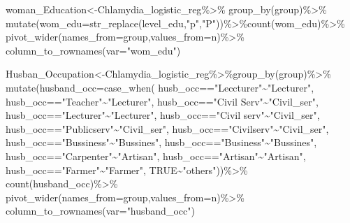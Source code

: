 \documentclass[
]{article}
\newenvironment{Shaded}{\begin{snugshade}}{\end{snugshade}}
\newcommand{\AttributeTok}[1]{\textcolor[rgb]{0.77,0.63,0.00}{#1}}
\newcommand{\ConstantTok}[1]{\textcolor[rgb]{0.00,0.00,0.00}{#1}}
\newcommand{\FunctionTok}[1]{\textcolor[rgb]{0.00,0.00,0.00}{#1}}
\newcommand{\NormalTok}[1]{#1}
\newcommand{\OtherTok}[1]{\textcolor[rgb]{0.56,0.35,0.01}{#1}}
\newcommand{\SpecialCharTok}[1]{\textcolor[rgb]{0.00,0.00,0.00}{#1}}
\newcommand{\StringTok}[1]{\textcolor[rgb]{0.31,0.60,0.02}{#1}}
\begin{document}
\begin{Shaded}
\begin{Highlighting}[]
\NormalTok{woman\_Education}\OtherTok{\textless{}{-}}\NormalTok{Chlamydia\_logistic\_reg}\SpecialCharTok{\%\textgreater{}\%}
  \FunctionTok{group\_by}\NormalTok{(group)}\SpecialCharTok{\%\textgreater{}\%}
  \FunctionTok{mutate}\NormalTok{(}\AttributeTok{wom\_edu=}\FunctionTok{str\_replace}\NormalTok{(level\_edu,}\StringTok{"p"}\NormalTok{,}\StringTok{"P"}\NormalTok{))}\SpecialCharTok{\%\textgreater{}\%}\FunctionTok{count}\NormalTok{(wom\_edu)}\SpecialCharTok{\%\textgreater{}\%}
  \FunctionTok{pivot\_wider}\NormalTok{(}\AttributeTok{names\_from=}\NormalTok{group,}\AttributeTok{values\_from=}\NormalTok{n)}\SpecialCharTok{\%\textgreater{}\%}
  \FunctionTok{column\_to\_rownames}\NormalTok{(}\AttributeTok{var=}\StringTok{"wom\_edu"}\NormalTok{)}

\NormalTok{Husban\_Occupation}\OtherTok{\textless{}{-}}\NormalTok{Chlamydia\_logistic\_reg}\SpecialCharTok{\%\textgreater{}\%}\FunctionTok{group\_by}\NormalTok{(group)}\SpecialCharTok{\%\textgreater{}\%}
  \FunctionTok{mutate}\NormalTok{(}\AttributeTok{husband\_occ=}\FunctionTok{case\_when}\NormalTok{(}
\NormalTok{    husb\_occ}\SpecialCharTok{==}\StringTok{"Leccturer"}\SpecialCharTok{\textasciitilde{}}\StringTok{"Lecturer"}\NormalTok{,}
\NormalTok{ husb\_occ}\SpecialCharTok{==}\StringTok{"Teacher"}\SpecialCharTok{\textasciitilde{}}\StringTok{"Lecturer"}\NormalTok{,}
\NormalTok{ husb\_occ}\SpecialCharTok{==}\StringTok{"Civil Serv"}\SpecialCharTok{\textasciitilde{}}\StringTok{"Civil\_ser"}\NormalTok{,}
\NormalTok{ husb\_occ}\SpecialCharTok{==}\StringTok{"Lecturer"}\SpecialCharTok{\textasciitilde{}}\StringTok{"Lecturer"}\NormalTok{,}
\NormalTok{husb\_occ}\SpecialCharTok{==}\StringTok{"Civil serv"}\SpecialCharTok{\textasciitilde{}}\StringTok{"Civil\_ser"}\NormalTok{,}
\NormalTok{husb\_occ}\SpecialCharTok{==}\StringTok{"Publicserv"}\SpecialCharTok{\textasciitilde{}}\StringTok{"Civil\_ser"}\NormalTok{,}
\NormalTok{husb\_occ}\SpecialCharTok{==}\StringTok{"Civilserv"}\SpecialCharTok{\textasciitilde{}}\StringTok{"Civil\_ser"}\NormalTok{,}
\NormalTok{husb\_occ}\SpecialCharTok{==}\StringTok{"Bussiness"}\SpecialCharTok{\textasciitilde{}}\StringTok{"Bussines"}\NormalTok{,}
\NormalTok{husb\_occ}\SpecialCharTok{==}\StringTok{"Business"}\SpecialCharTok{\textasciitilde{}}\StringTok{"Bussines"}\NormalTok{,}
\NormalTok{husb\_occ}\SpecialCharTok{==}\StringTok{"Carpenter"}\SpecialCharTok{\textasciitilde{}}\StringTok{"Artisan"}\NormalTok{,}
\NormalTok{husb\_occ}\SpecialCharTok{==}\StringTok{"Artisan"}\SpecialCharTok{\textasciitilde{}}\StringTok{"Artisan"}\NormalTok{,}
\NormalTok{husb\_occ}\SpecialCharTok{==}\StringTok{"Farmer"}\SpecialCharTok{\textasciitilde{}}\StringTok{"Farmer"}\NormalTok{,}
\ConstantTok{TRUE}\SpecialCharTok{\textasciitilde{}}\StringTok{"others"}\NormalTok{))}\SpecialCharTok{\%\textgreater{}\%}
  \FunctionTok{count}\NormalTok{(husband\_occ)}\SpecialCharTok{\%\textgreater{}\%}
  \FunctionTok{pivot\_wider}\NormalTok{(}\AttributeTok{names\_from=}\NormalTok{group,}\AttributeTok{values\_from=}\NormalTok{n)}\SpecialCharTok{\%\textgreater{}\%}
  \FunctionTok{column\_to\_rownames}\NormalTok{(}\AttributeTok{var=}\StringTok{"husband\_occ"}\NormalTok{)}


\end{Highlighting}
\end{Shaded}
\end{document}
